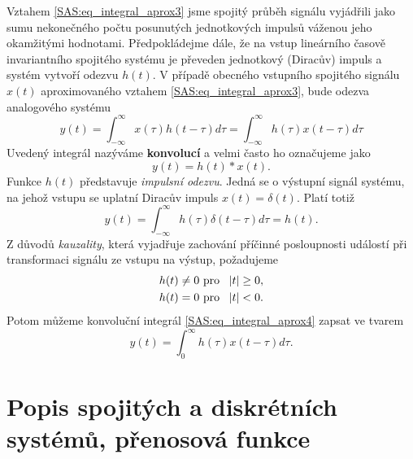       Vztahem \ref{SAS:eq_integral_aprox3} jsme spojitý průběh signálu vyjádřili jako sumu 
      nekonečného počtu posunutých jednotkových impulsů váženou jeho okamžitými hodnotami. 
      Předpokládejme dále, že na vstup lineárního časově invariantního spojitého systému je 
      převeden jednotkový (Diracův) impuls a systém vytvoří odezvu $h(t)$. V případě obecného 
      vstupního spojitého signálu $x(t)$ aproximovaného vztahem \ref{SAS:eq_integral_aprox3}, bude 
      odezva analogového systému
      \begin{equation}\label{SAS:eq_integral_aprox4}
        y(t) = \int_{-\infty}^{\infty}x(\tau)h(t-\tau)d\tau 
             = \int_{-\infty}^{\infty}h(\tau)x(t-\tau)d\tau
      \end{equation}
      Uvedený integrál nazýváme \textbf{konvolucí} a velmi často ho označujeme jako 
      \begin{equation}\label{SAS:eq_konvoluce}
        y(t) = h(t)*x(t) .
      \end{equation}
      Funkce $h(t)$ představuje \emph{impulsní odezvu}. Jedná se o výstupní signál systému, na 
      jehož vstupu se uplatní Diracův impuls $x(t)=\delta(t)$. Platí totiž
      \begin{equation}\label{SAS:eq_h_plati}
        y(t) = \int_{-\infty}^{\infty}h(\tau)\delta(t-\tau)d\tau = h(t) . 
      \end{equation}     
      Z důvodů \emph{kauzality}, která vyjadřuje zachování příčinné posloupnosti událostí při 
      transformaci signálu ze vstupu na výstup, požadujeme
      \begin{align}\label{SAS:eq_kauzalita_pozadavky}
        h(t) &\neq  0 \text{   pro } \abs{t} \geq0, \\
        h(t) &  =   0 \text{   pro } \abs{t} < 0. 
      \end{align}    
      Potom můžeme konvoluční integrál \ref{SAS:eq_integral_aprox4} zapsat ve tvarem
      \begin{equation}\label{SAS:eq_konvolucni_integral}
         y(t) = \int_0^{\infty}h(\tau)x(t-\tau)d\tau .
      \end{equation} 
  
  \section{Popis spojitých a diskrétních systémů, pře\-no\-so\-vá funkce}
